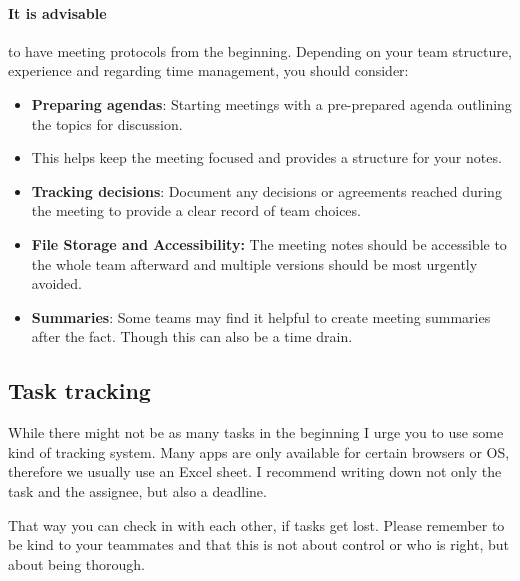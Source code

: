 \paragraph{It is advisable} to have meeting protocols from the beginning.
Depending on your team structure, experience and regarding time management, you should consider:
\begin{itemize}
    \item \textbf{Preparing agendas}: Starting meetings with a pre-prepared agenda outlining the topics for discussion.
    \item This helps keep the meeting focused and provides a structure for your notes.
    \item \textbf{Tracking decisions}: Document any decisions or agreements reached during the meeting to provide a clear record of team choices.
    \item \textbf{File Storage and Accessibility:} The meeting notes should be accessible to the whole team afterward and multiple versions should be most urgently avoided.
    \item \textbf{Summaries}: Some teams may find it helpful to create meeting summaries after the fact.
    Though this can also be a time drain.
\end{itemize}

\subsection{Task tracking}\label{subsec:task-tracking}
While there might not be as many tasks in the beginning I urge you to use some kind of tracking system.
Many apps are only available for certain browsers or OS, therefore we usually use an Excel sheet.
I recommend writing down not only the task and the assignee, but also a deadline.

That way you can check in with each other, if tasks get lost.
Please remember to be kind to your teammates and that this is not about control or who is right, but about being
thorough.

